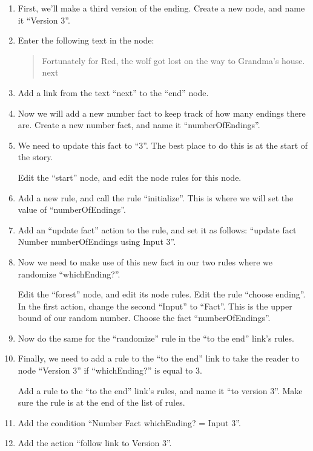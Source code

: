 \documentclass{article}
\begin{document}
\begin{enumerate}
    \item First, we'll make a third version of the ending. Create a 
    new node, and name it ``Version 3''.
    \item Enter the following text in the node:
    
    \begin{quotation}
    \noindent Fortunately for Red, the wolf got lost on the way to 
    Grandma's house.\\

    \noindent next
    \end{quotation}
    \item Add a link from the text ``next'' to the ``end'' node.
    \item Now we will add a new number fact to keep track of how many 
    endings there are. Create a new number fact, and name it 
    ``numberOfEndings''.
    \item We need to update this fact to ``3''. The best place to do 
    this is at the start of the story. 
    
    Edit the ``start'' node, and edit the node rules for this node.
    \item Add a new rule, and call the rule ``initialize''. This is 
    where we will set the value of ``numberOfEndings''.
    \item Add an ``update fact'' action to the rule, and set it as 
    follows: ``update fact Number numberOfEndings using Input 3''.
    \item Now we need to make use of this new fact in our two rules 
    where we randomize ``whichEnding?''.
    
    Edit the ``forest'' node, and edit its node rules. Edit the rule 
    ``choose ending''. In the first action, change the second 
    ``Input'' to ``Fact''. This is the upper bound of our random 
    number. Choose the fact ``numberOfEndings''.
    \item Now do the same for the ``randomize'' rule in the ``to the 
    end'' link's rules.
    \item Finally, we need to add a rule to the ``to the end'' link 
    to take the reader to node ``Version 3'' if ``whichEnding?'' is 
    equal to 3.
    
    Add a rule to the ``to the end'' link's rules, and name it ``to 
    version 3''. Make sure the rule is at the end of the list of 
    rules.
    \item Add the condition ``Number Fact whichEnding? = Input 3''.
    \item Add the action ``follow link to Version 3''.
\end{enumerate}
\end{document}
